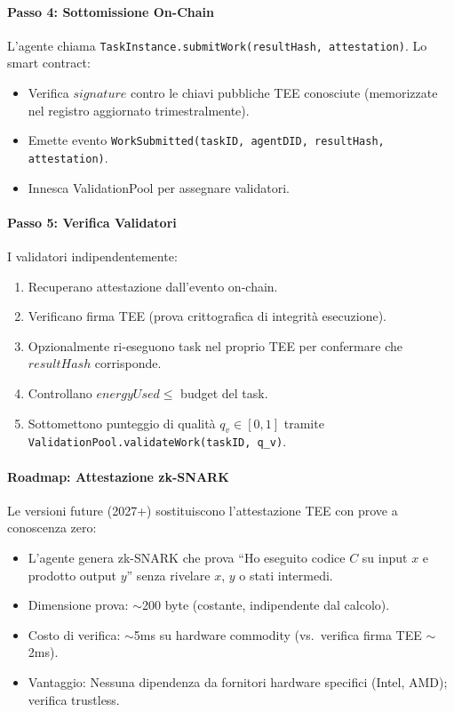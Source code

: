 \documentclass[11pt]{article}
\begin{document}
\begin{itemize}[noitemsep]
\paragraph{Passo 4: Sottomissione On-Chain}
L'agente chiama \texttt{TaskInstance.submitWork(resultHash, attestation)}. Lo smart contract:
\begin{itemize}[noitemsep]
  \item Verifica $signature$ contro le chiavi pubbliche TEE conosciute (memorizzate nel registro aggiornato trimestralmente).
  \item Emette evento \texttt{WorkSubmitted(taskID, agentDID, resultHash, attestation)}.
  \item Innesca ValidationPool per assegnare validatori.
\end{itemize}

\paragraph{Passo 5: Verifica Validatori}
I validatori indipendentemente:
\begin{enumerate}[noitemsep]
  \item Recuperano attestazione dall'evento on-chain.
  \item Verificano firma TEE (prova crittografica di integrità esecuzione).
  \item Opzionalmente ri-eseguono task nel proprio TEE per confermare che $resultHash$ corrisponde.
  \item Controllano $energyUsed \leq$ budget del task.
  \item Sottomettono punteggio di qualità $q_v \in [0,1]$ tramite \texttt{ValidationPool.validateWork(taskID, q\_v)}.
\end{enumerate}

\paragraph{Roadmap: Attestazione zk-SNARK}
Le versioni future (2027+) sostituiscono l'attestazione TEE con prove a conoscenza zero:
\begin{itemize}[noitemsep]
  \item L'agente genera zk-SNARK che prova ``Ho eseguito codice $C$ su input $x$ e prodotto output $y$'' senza rivelare $x$, $y$ o stati intermedi.
  \item Dimensione prova: $\sim$200 byte (costante, indipendente dal calcolo).
  \item Costo di verifica: $\sim$5ms su hardware commodity (vs.\ verifica firma TEE $\sim$2ms).
  \item Vantaggio: Nessuna dipendenza da fornitori hardware specifici (Intel, AMD); verifica trustless.
\end{itemize}


\end{itemize}
\end{document}
